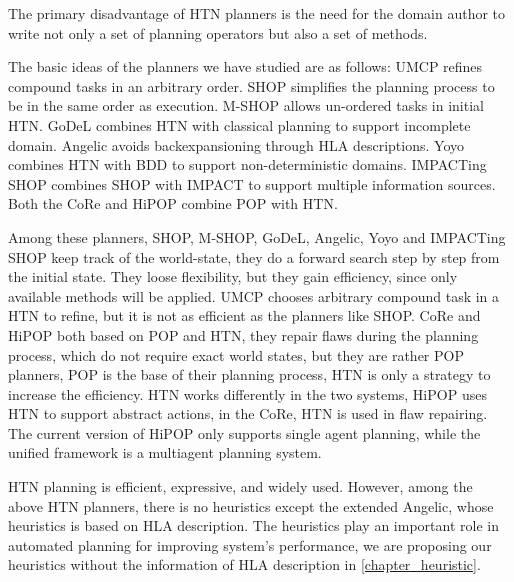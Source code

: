 The primary disadvantage of HTN planners is the need for the domain author to write not only a set of planning operators but also a set of methods.

The basic ideas of the planners we have studied are as follows: UMCP refines compound tasks in an arbitrary order. SHOP simplifies the planning process to be in the same order as execution. M-SHOP allows un-ordered tasks in initial HTN. GoDeL combines HTN with classical planning to support incomplete domain. Angelic avoids backexpansioning through HLA descriptions. Yoyo combines HTN with BDD to support non-deterministic domains. IMPACTing SHOP combines SHOP with IMPACT to support multiple information sources. Both the CoRe and HiPOP combine POP with HTN.

Among these planners, SHOP, M-SHOP, GoDeL, Angelic, Yoyo and IMPACTing SHOP keep track of the world-state, they do a forward search step by step from the initial state. They loose flexibility, but they gain efficiency, since only available methods will be applied. UMCP chooses arbitrary compound task in a HTN to refine, but it is not as efficient as the planners like SHOP. CoRe and HiPOP both based on POP and HTN, they repair flaws during the planning process, which do not require exact world states, but they are rather POP planners, POP is the base of their planning process, HTN is only a strategy to increase the efficiency. HTN works differently in the two systems, HiPOP uses HTN to support abstract actions, in the CoRe, HTN is used in flaw repairing. The current version of HiPOP only supports single agent planning, while the unified framework is a multiagent planning system.

HTN planning is efficient, expressive, and widely used. However, among the above HTN planners, there is no heuristics except the extended Angelic, whose heuristics is based on HLA description. The heuristics play an important role in automated planning for improving system’s performance, we are proposing our heuristics without the information of HLA description in \autoref{chapter_heuristic}.
